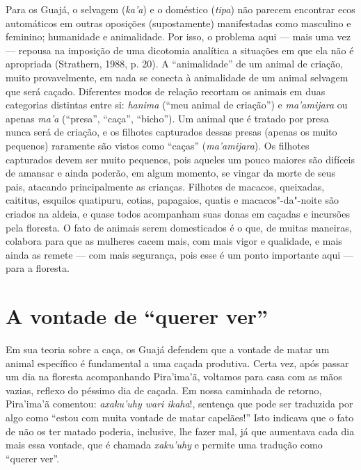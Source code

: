 Para os Guajá, o selvagem (\emph{ka'a}) e o doméstico (\emph{tipa}) não
parecem encontrar ecos automáticos em outras oposições (supostamente)
manifestadas como masculino e feminino; humanidade e animalidade. Por
isso, o problema aqui --- mais uma vez --- repousa na imposição de uma
dicotomia analítica a situações em que ela não é apropriada (Strathern,
1988, p. 20). A ``animalidade'' de um animal de criação, muito
provavelmente, em nada se conecta à animalidade de um animal selvagem
que será caçado. Diferentes modos de relação recortam os animais em duas
categorias distintas entre si: \emph{hanima} (``meu animal de criação'')
e \emph{ma'amijara} ou apenas \emph{ma'a} (``presa'', ``caça'',
``bicho''). Um animal que é tratado por presa nunca será de criação, e
os filhotes capturados dessas presas (apenas os muito pequenos)
raramente são vistos como ``caças'' (\emph{ma'amijara}). Os filhotes
capturados devem ser muito pequenos, pois aqueles um pouco maiores são
difíceis de amansar e ainda poderão, em algum momento, se vingar da
morte de seus pais, atacando principalmente as crianças. Filhotes de
macacos, queixadas, caititus, esquilos quatipuru, cotias, papagaios,
quatis e macacos"-da"-noite são criados na aldeia, e quase todos
acompanham suas donas em caçadas e incursões pela floresta. O fato de
animais serem domesticados é o que, de muitas maneiras, colabora para
que as mulheres cacem mais, com mais vigor e qualidade, e mais ainda as
remete --- com mais segurança, pois esse é um ponto importante aqui --- para
a floresta.

\section{A vontade de ``querer ver''}\label{a-vontade-de-querer-ver}

Em sua teoria sobre a caça, os Guajá defendem que a vontade de matar um
animal específico é fundamental a uma caçada produtiva. Certa vez, após
passar um dia na floresta acompanhando Pira'ima'ã, voltamos para casa
com as mãos vazias, reflexo do péssimo dia de caçada. Em nossa caminhada
de retorno, Pira'ima'ã comentou: \emph{axaku'uhy wari ikaha}!, sentença
que pode ser traduzida por algo como ``estou com muita vontade de matar
capelães!'' Isto indicava que o fato de não os ter matado poderia,
inclusive, lhe fazer mal, já que aumentava cada dia mais essa vontade,
que é chamada \emph{xaku'uhy} e permite uma tradução como ``querer ver''.

